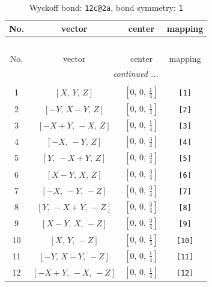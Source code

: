 \documentclass[fleqn,8pt]{jsarticle}
\begin{document}
\begin{longtable}{cccc}
\caption{Wyckoff bond: {\tt 12c@2a}, bond symmetry: {\tt 1}}
 \\
 \hline \hline
No. & vector & center & mapping \\ \hline \endfirsthead

\multicolumn{3}{l}{\tablename\ \thetable{}} \\
 \hline \hline
No. & vector & center & mapping \\ \hline \endhead

 \hline \hline
\multicolumn{3}{r}{\footnotesize\it continued ...} \\ \endfoot

 \hline \hline
\multicolumn{3}{r}{} \\ \endlastfoot

1 & $\left[ X,\, Y,\, Z \right]$ & $\left[ 0,\, 0,\, \frac{1}{4} \right]$ & {\tt [1]} \\ \hline
2 & $\left[ - Y,\, X - Y,\, Z \right]$ & $\left[ 0,\, 0,\, \frac{1}{4} \right]$ & {\tt [2]} \\ \hline
3 & $\left[ - X + Y,\, - X,\, Z \right]$ & $\left[ 0,\, 0,\, \frac{1}{4} \right]$ & {\tt [3]} \\ \hline
4 & $\left[ - X,\, - Y,\, Z \right]$ & $\left[ 0,\, 0,\, \frac{3}{4} \right]$ & {\tt [4]} \\ \hline
5 & $\left[ Y,\, - X + Y,\, Z \right]$ & $\left[ 0,\, 0,\, \frac{3}{4} \right]$ & {\tt [5]} \\ \hline
6 & $\left[ X - Y,\, X,\, Z \right]$ & $\left[ 0,\, 0,\, \frac{3}{4} \right]$ & {\tt [6]} \\ \hline
7 & $\left[ - X,\, - Y,\, - Z \right]$ & $\left[ 0,\, 0,\, \frac{3}{4} \right]$ & {\tt [7]} \\ \hline
8 & $\left[ Y,\, - X + Y,\, - Z \right]$ & $\left[ 0,\, 0,\, \frac{3}{4} \right]$ & {\tt [8]} \\ \hline
9 & $\left[ X - Y,\, X,\, - Z \right]$ & $\left[ 0,\, 0,\, \frac{3}{4} \right]$ & {\tt [9]} \\ \hline
10 & $\left[ X,\, Y,\, - Z \right]$ & $\left[ 0,\, 0,\, \frac{1}{4} \right]$ & {\tt [10]} \\ \hline
11 & $\left[ - Y,\, X - Y,\, - Z \right]$ & $\left[ 0,\, 0,\, \frac{1}{4} \right]$ & {\tt [11]} \\ \hline
12 & $\left[ - X + Y,\, - X,\, - Z \right]$ & $\left[ 0,\, 0,\, \frac{1}{4} \right]$ & {\tt [12]} \\
\end{longtable}
\end{document}
